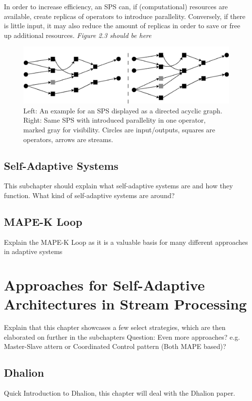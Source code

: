 In order to increase efficiency, an SPS can, if (computational) resources are available, create replicas of operators to introduce parallelity. Conversely, if there is little input, it may also reduce the amount of replicas in order to save or free up additional resources.
\textit{Figure 2.3 should be here}
\begin{figure}[htb]
\centering
\includegraphics[width=1.0\textwidth]{Bilder/sps_parallel_normal.png}
\caption{Left: An example for an SPS displayed as a directed acyclic graph. Right: Same SPS with introduced parallelity in one operator, marked gray for visibility. Circles are input/outputs, squares are operators, arrows are streams.}
\label{fig:growth_realtime_data}
\end{figure}


\section{Self-Adaptive Systems}
This subchapter should explain what self-adaptive systems are and how they function.
What kind of self-adaptive systems are around?

\section{MAPE-K Loop}
Explain the MAPE-K Loop as it is a valuable basis for many different approaches in adaptive systems


\chapter{Approaches for Self-Adaptive Architectures in Stream Processing}
Explain that this chapter showcases a few select strategies, which are then elaborated on further in the subchapters
Question: Even more approaches? e.g. Master-Slave attern or Coordinated Control pattern (Both MAPE based)?

\section{Dhalion}
Quick Introduction to Dhalion, this chapter will deal with the Dhalion paper.
